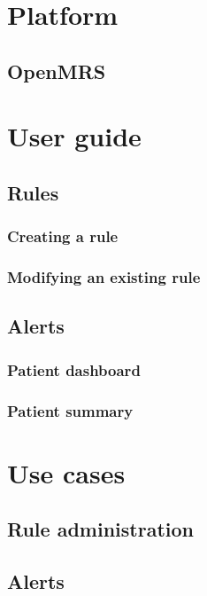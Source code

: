 \documentclass[12pt,letterpaper]{article}
\begin{document}
\newpage 
\section{Platform}

\subsection{OpenMRS}

\newpage 
\section{User guide}

\subsection{Rules}

\subsubsection{Creating a rule}

\subsubsection{Modifying an existing rule}

\subsection{Alerts}

\subsubsection{Patient dashboard}

\subsubsection{Patient summary}

\newpage 
\section{Use cases}

\subsection{Rule administration}

\subsection{Alerts}
\end{document}
